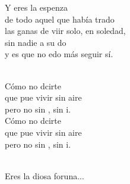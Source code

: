 \documentclass[12pt]{article}
\begin{document}
\begin{multicols*}{2}
\begin{cancion}
                        Y eres la espenza \\
                        de todo aquel que había trado\\
                        las ganas de viir solo, en soledad,\\
                        sin nadie a su do\\
                        y es que no edo más seguir sí.\\\jump\\
                        \begin{chorus}%
                        Cómo no dcirte\\
                        que pue vivir sin aire\\
                        pero no sin , sin i.\\
                \jump
                        Cómo no dcirte\\
                        que pue vivir sin aire\\
                        pero no sin , sin i.\\
                        \end{chorus}%
                        \jump\\
                        Eres la diosa foruna...\\
                \end{cancion}%
                
        

\end{multicols*}
    
\end{document}
